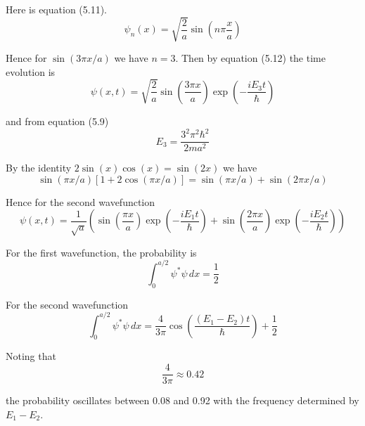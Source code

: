 


Here is equation (5.11).
\begin{equation*}
\psi_n(x)=\sqrt{\frac{2}{a}}\sin\left(n\pi\frac{x}{a}\right)
\tag{5.11}
\end{equation*}

Hence for $\sin(3\pi x/a)$ we have $n=3$.
Then by equation (5.12) the time evolution is
\begin{equation*}
\psi(x,t)=\sqrt{\frac{2}{a}}\sin\left(\frac{3\pi x}{a}\right)
\exp\left(-\frac{iE_3t}{\hbar}\right)
\end{equation*}

and from equation (5.9)
\begin{equation*}
E_3=\frac{3^2\pi^2\hbar^2}{2ma^2}
\end{equation*}

By the identity $2\sin(x)\cos(x)=\sin(2x)$ we have
\begin{equation*}
\sin(\pi x/a)[1+2\cos(\pi x/a)]
=\sin(\pi x/a)+\sin(2\pi x/a)
\end{equation*}

Hence for the second wavefunction
\begin{equation*}
\psi(x,t)=\frac{1}{\sqrt a}\left(
\sin\left(\frac{\pi x}{a}\right)
\exp\left(-\frac{iE_1t}{\hbar}\right)
+\sin\left(\frac{2\pi x}{a}\right)
\exp\left(-\frac{iE_2t}{\hbar}\right)
\right)
\end{equation*}

For the first wavefunction, the probability is
\begin{equation*}
\int_0^{a/2}\psi^*\psi\,dx=\frac{1}{2}
\end{equation*}

For the second wavefunction
\begin{equation*}
\int_0^{a/2}\psi^*\psi\,dx=\frac{4}{3\pi}
\cos\left(\frac{(E_1-E_2)t}{\hbar}\right)+\frac{1}{2}
\end{equation*}

Noting that
\begin{equation*}
\frac{4}{3\pi}\approx0.42
\end{equation*}

the probability oscillates between 0.08 and 0.92 with the
frequency determined by $E_1-E_2$.


